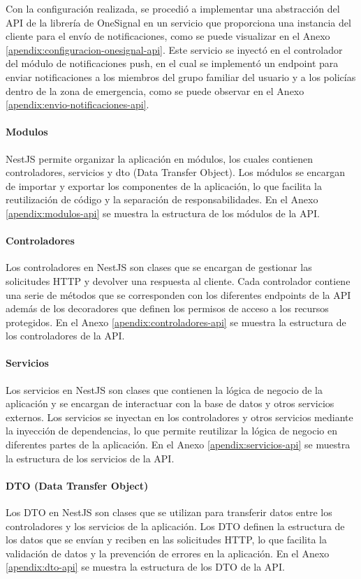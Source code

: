 Con la configuración realizada, se procedió a implementar una abstracción del API de la librería de OneSignal en un servicio que proporciona
una instancia del cliente para el envío de notificaciones, como se puede visualizar en el Anexo \ref{apendix:configuracion-onesignal-api}. Este servicio
se inyectó en el controlador del módulo de notificaciones push, en el cual se implementó un endpoint para enviar notificaciones a los miembros
del grupo familiar del usuario y a los policías dentro de la zona de emergencia, como se puede observar en el Anexo \ref{apendix:envio-notificaciones-api}.

\paragraph{Modulos}
NestJS permite organizar la aplicación en módulos, los cuales contienen controladores, servicios y dto (Data Transfer Object). Los módulos se encargan
de importar y exportar los componentes de la aplicación, lo que facilita la reutilización de código y la separación de responsabilidades. En el Anexo
\ref{apendix:modulos-api} se muestra la estructura de los módulos de la API.

\paragraph{Controladores}
Los controladores en NestJS son clases que se encargan de gestionar las solicitudes HTTP y devolver una respuesta al cliente. Cada controlador
contiene una serie de métodos que se corresponden con los diferentes endpoints de la API además de los decoradores que definen los permisos de
acceso a los recursos protegidos. En el Anexo \ref{apendix:controladores-api} se muestra la estructura de los controladores de la API.

\paragraph{Servicios}
Los servicios en NestJS son clases que contienen la lógica de negocio de la aplicación y se encargan de interactuar con la base de datos y otros
servicios externos. Los servicios se inyectan en los controladores y otros servicios mediante la inyección de dependencias, lo que permite reutilizar
la lógica de negocio en diferentes partes de la aplicación. En el Anexo \ref{apendix:servicios-api} se muestra la estructura de los servicios de la API.

\paragraph{DTO (Data Transfer Object)}
Los DTO en NestJS son clases que se utilizan para transferir datos entre los controladores y los servicios de la aplicación. Los DTO definen la
estructura de los datos que se envían y reciben en las solicitudes HTTP, lo que facilita la validación de datos y la prevención de errores en la
aplicación. En el Anexo \ref{apendix:dto-api} se muestra la estructura de los DTO de la API.

